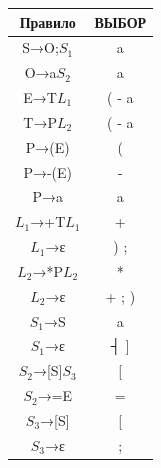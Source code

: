 \documentclass[a4paper,14pt]{extarticle}
\begin{document}
\begin{enumerate}[1.]
    \begin{tabular}{|c|c|}
        \hline
        Правило        & ВЫБОР\\
        \hline
        S→O;$S_1$      & a     \\
        \hline
        O→a$S_2$       & a     \\
        \hline
        E→T$L_1$       & ( - a \\
        \hline
        T→P$L_2$       & ( - a \\
        \hline
        P→(E)          & (     \\
        \hline
        P→-(E)         & -     \\
        \hline
        P→a            & a     \\
        \hline
        $L_1$→+T$L_1$  & +     \\
        \hline
        $L_1$→ε        & ) ;   \\
        \hline
        $L_2$→*P$L_2$  & *     \\
        \hline
        $L_2$→ε        & + ; ) \\
        \hline
        $S_1$→S        & a     \\
        \hline
        $S_1$→ε        & ┤ ]   \\
        \hline
        $S_2$→[S]$S_3$ & [     \\
        \hline
        $S_2$→=E       & =     \\
        \hline
        $S_3$→[S]      & [     \\
        \hline
        $S_3$→ε        & ;     \\
        \hline
    \end{tabular}\\


\end{enumerate}
\end{document}
